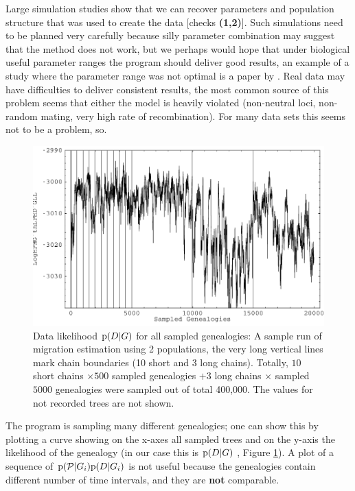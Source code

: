 Large simulation studies show that we can recover parameters and 
population structure that was used to create the data
[checks {\bf (1,2)}].  Such simulations need to be planned very carefully because silly parameter combination may suggest that the method does not work, but we perhaps would hope that under biological useful parameter ranges the program should deliver good results, an example of a study where the parameter range was not optimal is a paper by \cite{Abdo:2004:EPL}. Real data may have difficulties to deliver consistent results, the most common source of this problem seems that either the model is heavily violated (non-neutral loci, non-random mating, very high rate of recombination). For many data sets this seems not to be a problem, so.
\begin{figure}[htbp]
\begin{center}
\includegraphics[width=12cm]{mim/mixing}
\end{center}
\vskip -0.5cm
\caption{Data likelihood ${\rm p}(D|G)$ for all sampled genealogies: 
A sample run of migration estimation using 2 populations,
the very long vertical lines mark chain boundaries (10 short and
3 long chains). Totally, $10$ short chains $\times 500$ sampled genealogies 
$+ 3$ long chains $\times$ sampled $5000$ genealogies were sampled out of
total 400,000. The values for not recorded trees are 
not shown.
}
\label{FIGMIX}
\end{figure}

The program is sampling many different genealogies; one can show 
this by plotting
a curve showing on the x-axes all sampled trees and on the y-axis 
the likelihood of the genealogy (in our case this is ${\rm p}(D|G)$
, Figure \ref{FIGMIX}). 
A plot of a sequence of ${\rm p}(\mathcal{P}|G_i){\rm p}(D|G_i)$ is not 
useful because the genealogies contain different number of time intervals,
and they are {\bf not} comparable. 

